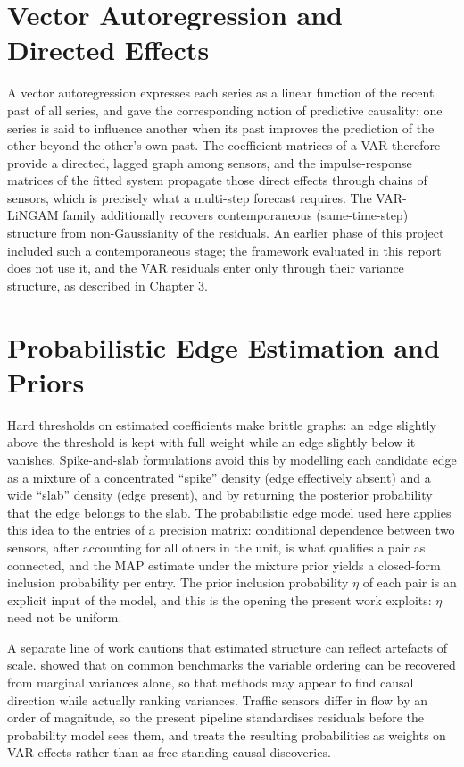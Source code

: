 \documentclass[MTech]{ugthesis}
\begin{document}
\section{Vector Autoregression and Directed Effects}
A vector autoregression expresses each series as a linear function of the recent past of all series, and \citet{granger1969} gave the corresponding notion of predictive causality: one series is said to influence another when its past improves the prediction of the other beyond the other's own past. The coefficient matrices of a VAR therefore provide a directed, lagged graph among sensors, and the impulse-response matrices of the fitted system propagate those direct effects through chains of sensors, which is precisely what a multi-step forecast requires. The VAR-LiNGAM family \citep{hyvarinen2010,shimizu2006lingam,shimizu2011directlingam} additionally recovers contemporaneous (same-time-step) structure from non-Gaussianity of the residuals. An earlier phase of this project included such a contemporaneous stage; the framework evaluated in this report does not use it, and the VAR residuals enter only through their variance structure, as described in Chapter 3.

\section{Probabilistic Edge Estimation and Priors}
Hard thresholds on estimated coefficients make brittle graphs: an edge slightly above the threshold is kept with full weight while an edge slightly below it vanishes. Spike-and-slab formulations avoid this by modelling each candidate edge as a mixture of a concentrated ``spike'' density (edge effectively absent) and a wide ``slab'' density (edge present), and by returning the posterior probability that the edge belongs to the slab. The probabilistic edge model used here \citep{hwang2026pem} applies this idea to the entries of a precision matrix: conditional dependence between two sensors, after accounting for all others in the unit, is what qualifies a pair as connected, and the \ac{MAP} estimate under the mixture prior yields a closed-form inclusion probability per entry. The prior inclusion probability $\eta$ of each pair is an explicit input of the model, and this is the opening the present work exploits: $\eta$ need not be uniform.

A separate line of work cautions that estimated structure can reflect artefacts of scale. \citet{reisach2021} showed that on common benchmarks the variable ordering can be recovered from marginal variances alone, so that methods may appear to find causal direction while actually ranking variances. Traffic sensors differ in flow by an order of magnitude, so the present pipeline standardises residuals before the probability model sees them, and treats the resulting probabilities as weights on VAR effects rather than as free-standing causal discoveries.
\end{document}
